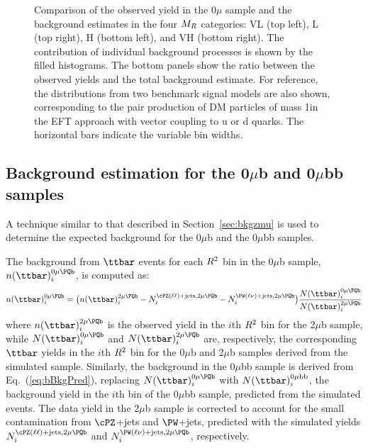 \begin{figure}
 \caption{Comparison of the observed yield in the $0\mu$ sample and the
   background estimates in the four $M_R$ categories:
   VL (top left), L (top right), H (bottom left), and VH (bottom right). The
   contribution of individual background processes is shown by the
   filled histograms. The bottom panels show the ratio
   between the observed yields and the total background estimate. For reference, the distributions from two
   benchmark signal models are also shown, corresponding to the pair
   production of DM particles of mass 1\GeV in the EFT approach with
   vector coupling to u or d quarks. The horizontal bars indicate
the variable bin widths.\label{fig:0muSignalBkg1GeV} }
\end{figure}

\subsection{Background estimation for the \texorpdfstring{0$\mu$b and 0$\mu$bb}{0 mu b and 0 mu bb} samples}
A technique similar to that described in Section~\ref{sec:bkgzmu} is used to determine the
expected background for the 0$\mu$b and the 0$\mu$bb samples.

The background from $\ttbar$ events for each $R^2$ bin in the
0$\mu$b sample, $n(\ttbar)_{i}^{0\mu\PQb}$, is computed as:
\begin{equation}
  n(\ttbar)_{i}^{0\mu\PQb} =  \bigl(n(\ttbar)_{i}^{2\mu\PQb} - N_{i}^{\cPZ(\ell
    \ell)+\text{jets},2\mu\PQb} - N_{i}^{\PW(\ell\nu)+\text{jets},2\mu\PQb}\bigr)
\frac{N(\ttbar)_{i}^{0\mu\PQb}}{N(\ttbar)_{i}^{2\mu\PQb}}\label{eq:bBkgPred}
\end{equation}
where $n(\ttbar)_{i}^{2\mu\PQb}$ is the observed yield in the $i$th $R^2$
bin for the 2$\mu$b sample, while $N(\ttbar)_{i}^{0\mu\PQb}$ and
$N(\ttbar)_{i}^{2\mu\PQb}$ are, respectively, the corresponding $\ttbar$ yields in the $i$th $R^2$
bin for the 0$\mu$b and 2$\mu$b samples derived from
the simulated \ttbar sample. Similarly, the \ttbar background in the
0$\mu$bb sample is derived from Eq.~(\ref{eq:bBkgPred}), replacing
$N(\ttbar)_{i}^{0\mu\PQb}$ with $N(\ttbar)_{i}^{0\mu\mathrm{bb}}$, the \ttbar
background yield in the $i$th bin of the 0$\mu$bb sample, predicted
from the simulated \ttbar events. The data yield in the 2$\mu$b sample is
corrected to account for the small contamination from $\cPZ$+jets and
 $\PW$+jets, predicted with the simulated yields $N_{i}^{\cPZ(\ell\ell)+\text{jets},2\mu\PQb}$ and
    $N_{i}^{\PW(\ell\nu)+\text{jets},2\mu\PQb}$, respectively.


